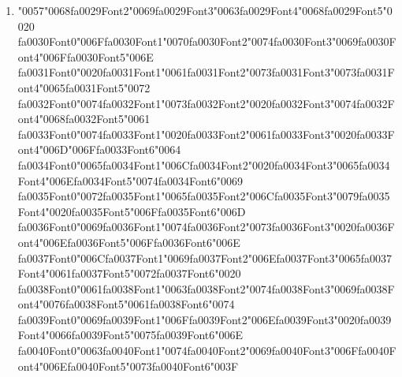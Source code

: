 \documentclass[11pt]{article}
\begin{document}
\begin{enumerate}[label=Q\arabic*., leftmargin=*]
\item {\char"0057}{\char"0068}{\csname fa0029Font2\endcsname\char"0069}{\csname fa0029Font3\endcsname\char"0063}{\csname fa0029Font4\endcsname\char"0068}{\csname fa0029Font5\endcsname\char"0020} {\csname fa0030Font0\endcsname\char"006F}{\csname fa0030Font1\endcsname\char"0070}{\csname fa0030Font2\endcsname\char"0074}{\csname fa0030Font3\endcsname\char"0069}{\csname fa0030Font4\endcsname\char"006F}{\csname fa0030Font5\endcsname\char"006E} {\csname fa0031Font0\endcsname\char"0020}{\csname fa0031Font1\endcsname\char"0061}{\csname fa0031Font2\endcsname\char"0073}{\csname fa0031Font3\endcsname\char"0073}{\csname fa0031Font4\endcsname\char"0065}{\csname fa0031Font5\endcsname\char"0072} {\csname fa0032Font0\endcsname\char"0074}{\csname fa0032Font1\endcsname\char"0073}{\csname fa0032Font2\endcsname\char"0020}{\csname fa0032Font3\endcsname\char"0074}{\csname fa0032Font4\endcsname\char"0068}{\csname fa0032Font5\endcsname\char"0061} {\csname fa0033Font0\endcsname\char"0074}{\csname fa0033Font1\endcsname\char"0020}{\csname fa0033Font2\endcsname\char"0061}{\csname fa0033Font3\endcsname\char"0020}{\csname fa0033Font4\endcsname\char"006D}{\char"006F}{\csname fa0033Font6\endcsname\char"0064} {\csname fa0034Font0\endcsname\char"0065}{\csname fa0034Font1\endcsname\char"006C}{\csname fa0034Font2\endcsname\char"0020}{\csname fa0034Font3\endcsname\char"0065}{\csname fa0034Font4\endcsname\char"006E}{\csname fa0034Font5\endcsname\char"0074}{\csname fa0034Font6\endcsname\char"0069} {\csname fa0035Font0\endcsname\char"0072}{\csname fa0035Font1\endcsname\char"0065}{\csname fa0035Font2\endcsname\char"006C}{\csname fa0035Font3\endcsname\char"0079}{\csname fa0035Font4\endcsname\char"0020}{\csname fa0035Font5\endcsname\char"006F}{\csname fa0035Font6\endcsname\char"006D} {\csname fa0036Font0\endcsname\char"0069}{\csname fa0036Font1\endcsname\char"0074}{\csname fa0036Font2\endcsname\char"0073}{\csname fa0036Font3\endcsname\char"0020}{\csname fa0036Font4\endcsname\char"006E}{\csname fa0036Font5\endcsname\char"006F}{\csname fa0036Font6\endcsname\char"006E} {\csname fa0037Font0\endcsname\char"006C}{\csname fa0037Font1\endcsname\char"0069}{\csname fa0037Font2\endcsname\char"006E}{\csname fa0037Font3\endcsname\char"0065}{\csname fa0037Font4\endcsname\char"0061}{\csname fa0037Font5\endcsname\char"0072}{\csname fa0037Font6\endcsname\char"0020} {\csname fa0038Font0\endcsname\char"0061}{\csname fa0038Font1\endcsname\char"0063}{\csname fa0038Font2\endcsname\char"0074}{\csname fa0038Font3\endcsname\char"0069}{\csname fa0038Font4\endcsname\char"0076}{\csname fa0038Font5\endcsname\char"0061}{\csname fa0038Font6\endcsname\char"0074} {\csname fa0039Font0\endcsname\char"0069}{\csname fa0039Font1\endcsname\char"006F}{\csname fa0039Font2\endcsname\char"006E}{\csname fa0039Font3\endcsname\char"0020}{\csname fa0039Font4\endcsname\char"0066}{\csname fa0039Font5\endcsname\char"0075}{\csname fa0039Font6\endcsname\char"006E} {\csname fa0040Font0\endcsname\char"0063}{\csname fa0040Font1\endcsname\char"0074}{\csname fa0040Font2\endcsname\char"0069}{\csname fa0040Font3\endcsname\char"006F}{\csname fa0040Font4\endcsname\char"006E}{\csname fa0040Font5\endcsname\char"0073}{\csname fa0040Font6\endcsname\char"003F}


\end{enumerate}
\end{document}
